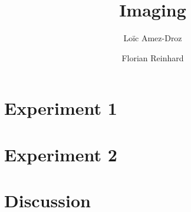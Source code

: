\documentclass[a4paper, 12pt]{paper}
\author{Loïc Amez-Droz \and Florian Reinhard}
\title{Imaging}
\begin{document}

\section{Experiment 1}
\lipsum[1]
\section{Experiment 2}

\lipsum[4]
\section{Discussion}
\lipsum[6]
\end{document}
